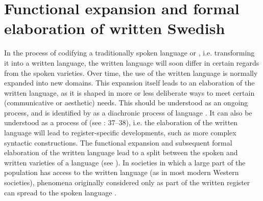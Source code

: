 \documentclass[output=paper]{langscibook}
\begin{document}
\section{Functional expansion and formal elaboration of written Swedish}\label{sec:kalm:2}



In the process of codifying a traditionally spoken language or , i.e. transforming it into a written language, the written language will soon differ in certain regards from the spoken varieties. Over time, the use of the written language is normally expanded into new domains. This expansion itself leads to an elaboration of the written language, as it is shaped in more or less deliberate ways to meet certain (communicative or aesthetic) needs. This should be understood as an ongoing process, and is identified by \citet{Kloss1967} as a diachronic process of language . It can also be understood as a process of  (see \citealt{Fischer2007}: 37–38), i.e. the elaboration of the written language will lead to register-specific developments, such as more complex syntactic constructions. The functional expansion and subsequent formal elaboration of the written language lead to a split between the spoken and written varieties of a language (see \citealt{Hoder2009}). In societies in which a large part of the population has access to the written language (as in most modern Western societies), phenomena originally considered only as part of the written register can spread to the spoken language \parencites[37]{Fischer2007}[]{Weis2004}. 
\end{document}

